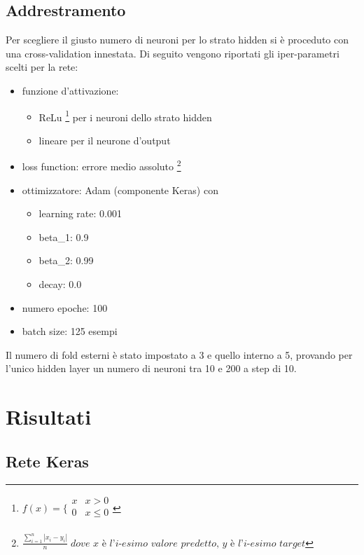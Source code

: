 \documentclass[12pt]{report}
\begin{document}
\subsection{Addrestramento}
Per scegliere il giusto numero di neuroni per lo strato hidden si è proceduto con una cross-validation innestata. Di seguito vengono riportati gli iper-parametri scelti per la rete:
\begin{itemize}
\item{funzione d’attivazione}:

\begin{itemize}
\item{ReLu 
\footnote{$f(x) =
\bigg \{
\begin{array}{rl}
x & x > 0 \\
0 & x \leq 0 \\
\end{array}
$
} per i neuroni dello strato hidden}
\item{lineare per il neurone d'output}
\end{itemize}

\item{loss function}: errore medio assoluto \footnote{
$\displaystyle{\frac{\sum_{i=1}^n \left|x_i - y_i\right|}{n}} \; \textit{dove x è l'i-esimo valore predetto, y è l'i-esimo target}$
}

\item{ottimizzatore}: Adam (componente Keras) con

\begin{itemize}
\item{learning rate}: 0.001
\item{beta\_1}: 0.9
\item{beta\_2}: 0.99
\item{decay}: 0.0
\end{itemize}

\item{numero epoche}: 100

\item{batch size}: 125 esempi
\end{itemize}

Il numero di fold esterni è stato impostato a 3 e quello interno a 5, provando per l'unico hidden layer un numero di neuroni tra 10 e 200 a step di 10.

\section{Risultati}

\subsection{Rete Keras}
\end{document}
